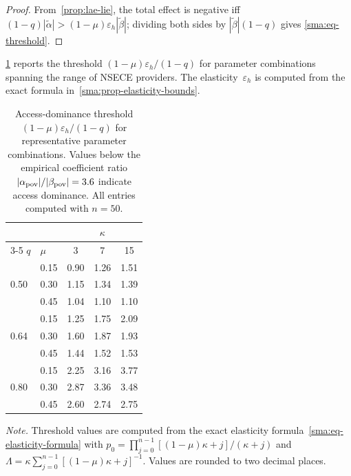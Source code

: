 \begin{proof}
  From~\cref{prop:lae-lie}, the total effect is negative iff
  $(1-q)|\tilde{\alpha}| > (1-\mu)\varepsilon_h|\tilde{\beta}|$;
  dividing both sides by $|\tilde{\beta}|(1-q)$ gives
  \eqref{sma:eq-threshold}.
\end{proof}

\cref{sma:tab-threshold} reports the threshold
$(1-\mu)\varepsilon_h/(1-q)$ for parameter combinations spanning the
range of NSECE providers. The elasticity~$\varepsilon_h$ is computed
from the exact formula in~\cref{sma:prop-elasticity-bounds}.

\begin{table}[ht]
\centering
\caption{Access-dominance threshold $(1-\mu)\varepsilon_h/(1-q)$ for
  representative parameter combinations. Values below the empirical
  coefficient ratio $|\alpha_{\textup{pov}}|/|\beta_{\textup{pov}}| = 3.6$
  indicate access dominance. All entries computed with $n = 50$.}
\label{sma:tab-threshold}
\smallskip
\begin{tabular}{llccc}
\toprule
 & & \multicolumn{3}{c}{$\kappa$} \\
\cmidrule(lr){3-5}
$q$ & $\mu$ & 3 & 7 & 15 \\
\midrule
\multirow{3}{*}{0.50}
 & 0.15 & 0.90 & 1.26 & 1.51 \\
 & 0.30 & 1.15 & 1.34 & 1.39 \\
 & 0.45 & 1.04 & 1.10 & 1.10 \\[4pt]
\multirow{3}{*}{0.64}
 & 0.15 & 1.25 & 1.75 & 2.09 \\
 & 0.30 & 1.60 & 1.87 & 1.93 \\
 & 0.45 & 1.44 & 1.52 & 1.53 \\[4pt]
\multirow{3}{*}{0.80}
 & 0.15 & 2.25 & 3.16 & 3.77 \\
 & 0.30 & 2.87 & 3.36 & 3.48 \\
 & 0.45 & 2.60 & 2.74 & 2.75 \\
\bottomrule
\end{tabular}

\medskip
{\footnotesize\textit{Note.} Threshold values are computed from the exact
  elasticity formula~\eqref{sma:eq-elasticity-formula} with
  $p_0 = \prod_{j=0}^{n-1}[(1-\mu)\kappa + j]/(\kappa + j)$
  and $\Lambda = \kappa\sum_{j=0}^{n-1}[(1-\mu)\kappa + j]^{-1}$.
  Values are rounded to two decimal places.}
\end{table}

